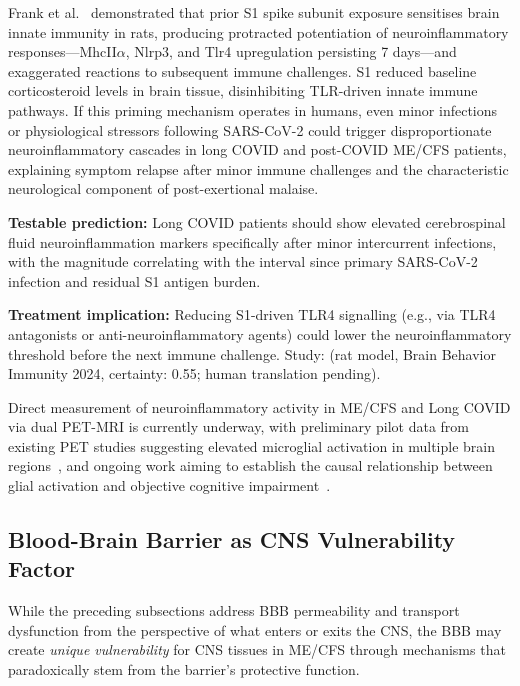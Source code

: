 \begin{hypothesis}
\label{hyp:frank2024-s1-priming}
Frank et al.~\cite{Frank2024S1Priming} demonstrated that prior S1 spike subunit
exposure sensitises brain innate immunity in rats, producing protracted potentiation
of neuroinflammatory responses---MhcII$\alpha$, Nlrp3, and Tlr4 upregulation
persisting 7 days---and exaggerated reactions to subsequent immune challenges.
S1 reduced baseline corticosteroid levels in brain tissue, disinhibiting TLR-driven
innate immune pathways. If this priming mechanism operates in humans, even minor
infections or physiological stressors following SARS-CoV-2 could trigger
disproportionate neuroinflammatory cascades in long COVID and post-COVID ME/CFS
patients, explaining symptom relapse after minor immune challenges and the
characteristic neurological component of post-exertional malaise.

\textbf{Testable prediction:} Long COVID patients should show elevated cerebrospinal
fluid neuroinflammation markers specifically after minor intercurrent infections, with
the magnitude correlating with the interval since primary SARS-CoV-2 infection and
residual S1 antigen burden.

\textbf{Treatment implication:} Reducing S1-driven TLR4 signalling (e.g., via
TLR4 antagonists or anti-neuroinflammatory agents) could lower the neuroinflammatory
threshold before the next immune challenge.
Study: (rat model, Brain Behavior Immunity 2024, certainty: 0.55; human translation pending).
\end{hypothesis}

Direct measurement of neuroinflammatory activity in ME/CFS and Long COVID via dual PET-MRI is currently underway, with preliminary pilot data from existing PET studies suggesting elevated microglial activation in multiple brain regions~\cite{Nakatomi2014neuroinflammation}, and ongoing work aiming to establish the causal relationship between glial activation and objective cognitive impairment~\cite{VanElzakker2024NeuroinflammationProject}.

\subsection{Blood-Brain Barrier as CNS Vulnerability Factor}
\label{sec:bbb-vulnerability}

While the preceding subsections address BBB permeability and transport dysfunction from the perspective of what enters or exits the CNS, the BBB may create \emph{unique vulnerability} for CNS tissues in ME/CFS through mechanisms that paradoxically stem from the barrier's protective function.

